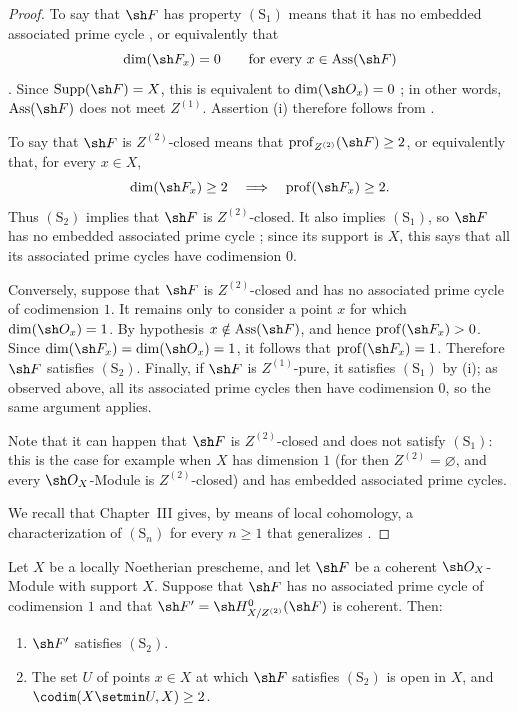 \begin{proof}
To say that $\sh F$ has property $(\mathrm S_1)$ means that it
has no embedded associated prime cycle , or
equivalently that
\[
  \dim(\sh F_x)=0
  \qquad\text{for every }x\in\operatorname{Ass}(\sh F)
\]
.  Since $\operatorname{Supp}(\sh F)=X$, this is
equivalent to $\dim(\sh O_x)=0$ ; in other
words, $\operatorname{Ass}(\sh F)$ does not meet $Z^{(1)}$.
Assertion {\rm(i)} therefore follows from .

To say that $\sh F$ is $Z^{(2)}$-closed means that $\operatorname{prof}_{Z^{(2)}}(\sh F)\geq2$,
or equivalently that, for every $x\in X$,
\[
  \dim(\sh F_x)\geq2
  \quad\Longrightarrow\quad
  \operatorname{prof}(\sh F_x)\geq2.
\]
Thus $(\mathrm S_2)$ implies that $\sh F$ is $Z^{(2)}$-closed.
It also implies $(\mathrm S_1)$, so $\sh F$ has no embedded
associated prime cycle ; since its support is
$X$, this says that all its associated prime cycles have
codimension $0$.

Conversely, suppose that $\sh F$ is $Z^{(2)}$-closed and has no
associated prime cycle of codimension $1$.  It remains only to
consider a point $x$ for which $\dim(\sh O_x)=1$.  By hypothesis
$x\notin\operatorname{Ass}(\sh F)$, and hence
$\operatorname{prof}(\sh F_x)>0$.  Since
$\dim(\sh F_x)=\dim(\sh O_x)=1$, it follows that
$\operatorname{prof}(\sh F_x)=1$.  Therefore $\sh F$ satisfies
$(\mathrm S_2)$.  Finally, if $\sh F$ is $Z^{(1)}$-pure, it
satisfies $(\mathrm S_1)$ by {\rm(i)}; as observed above, all its
associated prime cycles then have codimension $0$, so the same
argument applies.

Note that it can happen that $\sh F$ is $Z^{(2)}$-closed and does not
satisfy $(\mathrm S_1)$: this is the case for example when $X$ has
dimension $1$ (for then $Z^{(2)}=\varnothing$, and every
$\sh O_X$-Module is $Z^{(2)}$-closed) and has embedded associated
prime cycles.

We recall that Chapter~III gives, by means of local cohomology, a
characterization of $(\mathrm S_n)$ for every $n\geq1$ that
generalizes .
\end{proof}

\begin{corollary}[5.10.15]
\label{IV.5.10.15}
Let $X$ be a locally Noetherian prescheme, and let $\sh F$ be a
coherent $\sh O_X$-Module with support $X$.  Suppose that $\sh F$
has no associated prime cycle of codimension $1$ and that $\sh F'=\sh H^0_{X/Z^{(2)}}(\sh F)$
is coherent.  Then:
\begin{enumerate}[{\rm(i)}]
  \item $\sh F'$ satisfies $(\mathrm S_2)$.


  \item The set $U$ of points $x\in X$ at which $\sh F$
  satisfies $(\mathrm S_2)$  is open in $X$, and $\codim(X\setmin U,X)\geq2$.
\end{enumerate}
\end{corollary}

